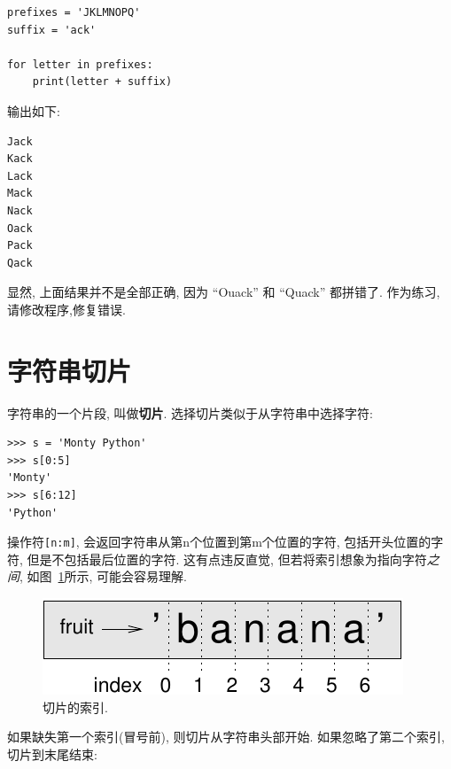 \documentclass[10pt]{book}
\begin{document}
\begin{verbatim}
prefixes = 'JKLMNOPQ'
suffix = 'ack'

for letter in prefixes:
    print(letter + suffix)
\end{verbatim}
%
输出如下:

\begin{verbatim}
Jack
Kack
Lack
Mack
Nack
Oack
Pack
Qack
\end{verbatim}
%
显然, 上面结果并不是全部正确, 因为 ``Ouack'' 和 ``Quack'' 都拼错了. 
作为练习, 请修改程序,修复错误. 

\section{字符串切片}
\label{slice}
  
 

字符串的一个片段, 叫做{\bf 切片}.
选择切片类似于从字符串中选择字符:

\begin{verbatim}
>>> s = 'Monty Python'
>>> s[0:5]
'Monty'
>>> s[6:12]
'Python'
\end{verbatim}
%
操作符{\tt [n:m]}, 会返回字符串从第n个位置到第m个位置的字符, 
包括开头位置的字符, 但是不包括最后位置的字符. 
这有点违反直觉, 但若将索引想象为指向字符{\em 之间}, 如图~\ref{fig.banana}所示,
可能会容易理解. 

\begin{figure}
\centerline
{\includegraphics[scale=0.8]{figs/banana.pdf}}
\caption{切片的索引.}
\label{fig.banana}
\end{figure}
如果缺失第一个索引(冒号前), 则切片从字符串头部开始. 
如果忽略了第二个索引, 切片到末尾结束:
\end{document}
